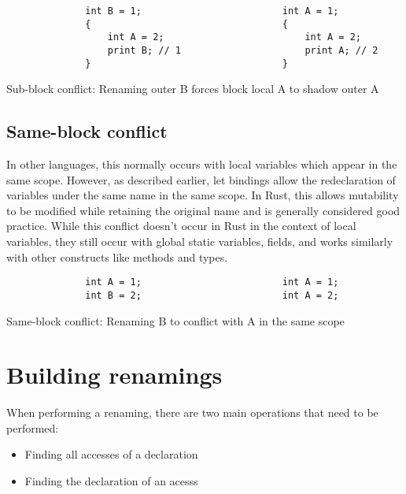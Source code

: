 \begin{fig}[H]
\begin{verbatim}
              int B = 1;                         int A = 1;
              {                                  {
                  int A = 2;                         int A = 2;
                  print B; // 1                      print A; // 2
              }                                  }
\end{verbatim}
\caption{Sub-block conflict: Renaming outer B forces block local A to shadow outer A}
\label{Fig:sub}
\end{fig}

\subsection{Same-block conflict}
In other languages, this normally occurs with local variables which appear in the same scope. However, as described earlier, let bindings allow the redeclaration of variables under the same name in the same scope. In Rust, this allows mutability to be modified while retaining the original name and is generally considered good practice. While this conflict doesn't occur in Rust in the context of local variables, they still occur with global static variables, fields, and works similarly with other constructs like methods and types.

\begin{fig}[H]
\begin{verbatim}
              int A = 1;                         int A = 1;
              int B = 2;                         int A = 2;
\end{verbatim}
\caption{Same-block conflict: Renaming B to conflict with A in the same scope}
\label{Fig:same}
\end{fig}


\section{Building renamings}\label{S:br}
When performing a renaming, there are two main operations that need to be performed:
\begin{itemize}
\item Finding all accesses of a declaration
\item Finding the declaration of an acesss
\end{itemize}


